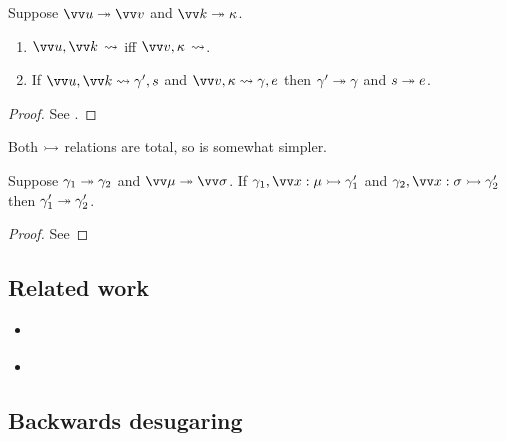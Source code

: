 \begin{lemma}
   \label{lem:match-seq-eq}
   Suppose $\seq{u} \desugar \seq{v}$ and $\seq{k} \desugar \kappa$.
   \hfill
   \begin{enumerate}
      \item $\seq{u}, \seq{k}\,\match$ iff $\seq{v},\kappa\,\match$.
      \item If $\seq{u}, \seq{k} \match \gamma', s$ and $\seq{v}, \kappa \match \gamma, e$ then $\gamma' \twoheadrightarrow \gamma$ and $s \twoheadrightarrow e$.
   \end{enumerate}
\end{lemma}
\begin{proof}
   See .
\end{proof}

Both $\rightarrowtail$ relations are total, so  is somewhat simpler.

\begin{lemma}
   \label{lem:closedefs-eq}
   Suppose $\gamma_1 \twoheadrightarrow \gamma_2$ and $\seq{\mu} \desugar \seq{\sigma}$. If $\gamma_1, \seq{\bind{x}{\mu}} \closeDefs \gamma_1'$ and $\gamma_2, \seq{\bind{x}{\sigma}} \closeDefs \gamma_2'$ then $\gamma_1' \twoheadrightarrow \gamma_2'$.
\end{lemma}
\begin{proof}
   See 
\end{proof}

\subsection{Related work}

\begin{itemize}
   \item \citet{pombrio14}
   \item \citet{yang22}
\end{itemize}

\subsection{Backwards desugaring}




